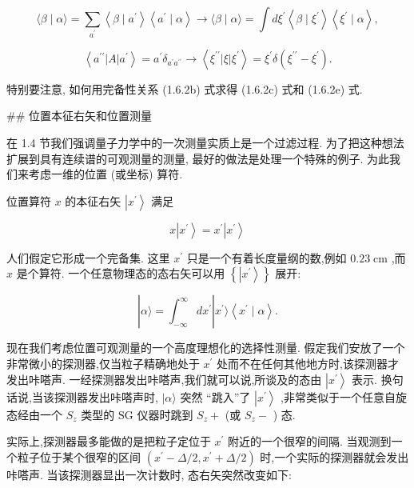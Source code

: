\documentclass[lang=cn,newtx,10pt,scheme=chinese,thmcnt=section]{elegantbook}
\begin{document}
$$
\langle \beta \mid \alpha \rangle = \mathop{\sum }\limits_{{a}^{\prime }}\left\langle {\beta \mid {a}^{\prime }}\right\rangle \left\langle {{a}^{\prime } \mid \alpha }\right\rangle \rightarrow \langle \beta \mid \alpha \rangle = \int d{\xi }^{\prime }\left\langle {\beta \mid {\xi }^{\prime }}\right\rangle \left\langle {{\xi }^{\prime } \mid \alpha }\right\rangle , \tag{1.6.2e}
$$

$$
\left\langle {{a}^{\prime \prime }\left| A\right| {a}^{\prime }}\right\rangle = {a}^{\prime }{\delta }_{{a}^{\prime }{a}^{\prime \prime }} \rightarrow \left\langle {{\xi }^{\prime \prime }\left| \xi \right| {\xi }^{\prime }}\right\rangle = {\xi }^{\prime }\delta \left( {{\xi }^{\prime \prime } - {\xi }^{\prime }}\right) . \tag{1.6.2f}
$$

特别要注意, 如何用完备性关系 (1.6.2b) 式求得 (1.6.2c) 式和 (1.6.2e) 式.

## 位置本征右矢和位置测量

在 1.4 节我们强调量子力学中的一次测量实质上是一个过滤过程. 为了把这种想法扩展到具有连续谱的可观测量的测量, 最好的做法是处理一个特殊的例子. 为此我们来考虑一维的位置 (或坐标) 算符.

位置算符 $x$ 的本征右矢 $\left| {x}^{\prime }\right\rangle$ 满足

$$
x\left| {x}^{\prime }\right\rangle = {x}^{\prime }\left| {x}^{\prime }\right\rangle \tag{1.6.3}
$$

人们假定它形成一个完备集. 这里 ${x}^{\prime }$ 只是一个有着长度量纲的数,例如 ${0.23}\mathrm{\;{cm}}$ ,而 $x$ 是个算符. 一个任意物理态的态右矢可以用 $\left\{ \left| {x}^{\prime }\right\rangle \right\}$ 展开:

$$
\left| {\alpha \rangle = {\int }_{-\infty }^{\infty }d{x}^{\prime }}\right| {x}^{\prime }\rangle \left\langle {{x}^{\prime } \mid \alpha }\right\rangle . \tag{1.6.4}
$$

现在我们考虑位置可观测量的一个高度理想化的选择性测量. 假定我们安放了一个非常微小的探测器,仅当粒子精确地处于 ${x}^{\prime }$ 处而不在任何其他地方时,该探测器才发出咔嗒声. 一经探测器发出咔嗒声,我们就可以说,所谈及的态由 $\left| {x}^{\prime }\right\rangle$ 表示. 换句话说,当该探测器发出咔嗒声时, $|\alpha \rangle$ 突然 “跳入”了 $\left| {x}^{\prime }\right\rangle$ ,非常类似于一个任意自旋态经由一个 ${S}_{z}$ 类型的 $\mathrm{{SG}}$ 仪器时跳到 ${S}_{z} +$ (或 ${S}_{z} -$ ) 态.

实际上,探测器最多能做的是把粒子定位于 ${x}^{\prime }$ 附近的一个很窄的间隔. 当观测到一个粒子位于某个很窄的区间 $\left( {{x}^{\prime } - \Delta /2,{x}^{\prime } + \Delta /2}\right)$ 时,一个实际的探测器就会发出咔嗒声. 当该探测器显出一次计数时, 态右矢突然改变如下:
\end{document}
